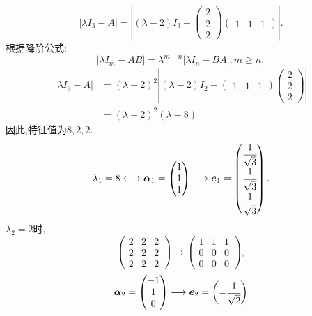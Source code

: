 \begin{solution}
  \[
  |\lambda I_3-A|=\left\vert(\lambda-2)I_3-\begin{pmatrix}
    2\\2\\2\end{pmatrix}\begin{pmatrix}
      1 & 1 & 1\end{pmatrix}\right\vert.
  \]
  根据降阶公式:
  \[
  |\lambda I_m-AB| = \lambda^{m-n}|\lambda I_n-BA|, m\geq n,
  \]
  \begin{align*}
  |\lambda I_3-A| & = (\lambda-2)^2\left\vert(\lambda-2)I_2-\begin{pmatrix}
    1 & 1 & 1\end{pmatrix}\begin{pmatrix}
      2\\2\\2\end{pmatrix}\right\vert\\
      & =(\lambda-2)^2(\lambda-8)
    \end{align*}
  因此,特征值为$8,2,2$.
  \[
  \lambda_1=8 \longleftrightarrow \bm{\alpha}_1=\begin{pmatrix}
    1\\1\\1\end{pmatrix} \longrightarrow \bm{e}_1 = 
    \begin{pmatrix}
      \cfrac{1}{\sqrt{3}}\\
      \cfrac{1}{\sqrt{3}}\\
      \cfrac{1}{\sqrt{3}}
    \end{pmatrix}.
  \]
  $\lambda_2=2$时,
  \[
  \begin{pmatrix}
    2 & 2 & 2\\
    2 & 2 & 2\\
    2 & 2 & 2
  \end{pmatrix} \longrightarrow \begin{pmatrix}
    1 & 1 & 1\\
    0 & 0 & 0\\
    0 & 0 & 0
  \end{pmatrix},
  \]
  \[
  \bm{\alpha}_2=\begin{pmatrix}
    -1\\1\\0\end{pmatrix} \longrightarrow \bm{e}_2 =
    \begin{pmatrix}
      -\cfrac{1}{\sqrt{2}}\\

\end{pmatrix}\]
\end{solution}
